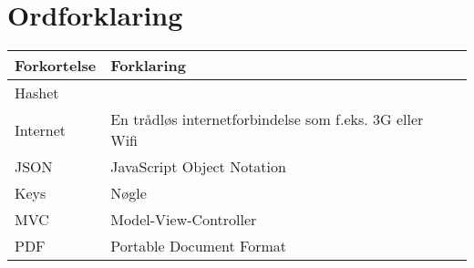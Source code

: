 \chapter*{Ordforklaring}

\begin{tabularx}{\textwidth}{l l X} \hline
	\textbf{Forkortelse}  & \textbf{Forklaring} \\ \hline
	Hashet& & \\
	Internet&  En trådløs internetforbindelse som f.eks. 3G eller Wifi& \\
	JSON& JavaScript Object Notation& \\
	Keys& Nøgle&  \\
	MVC& Model-View-Controller& \\
	PDF& Portable Document Format& \\ 
	
\end{tabularx}
